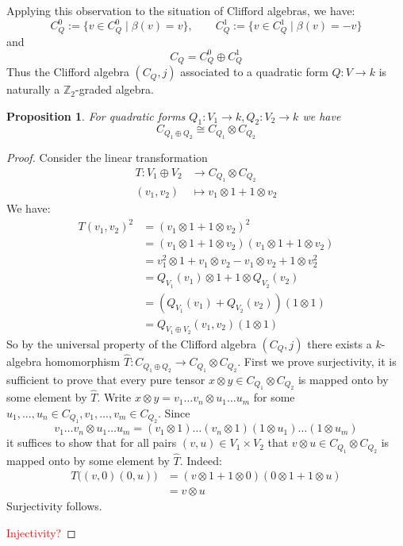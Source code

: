 \documentclass[12pt]{article}
\theoremstyle{plain}
\newtheorem{proposition}[thm]{Proposition}
\theoremstyle{definition}
\newcommand{\bb}[1]{\mathbb{#1}}
\newcommand{\lto}{\longrightarrow}
\begin{document}
Applying this observation to the situation of Clifford algebras, we have:
\begin{equation}
	C_Q^0 := \lbrace v \in C_Q^0 \mid \beta(v) = v\rbrace, \qquad C_Q^1 := \lbrace v \in C_Q^1 \mid \beta(v) = -v\rbrace
\end{equation}
and
\begin{equation}
	C_Q = C_Q^0 \oplus C_Q^1
\end{equation}
Thus the Clifford algebra $(C_Q,j)$ associated to a quadratic form $Q: V \lto k$ is naturally a $\bb{Z}_2$-graded algebra.
\begin{proposition}\label{prop:sum_tensor}
	For quadratic forms $Q_1: V_1 \lto k, Q_2: V_2 \lto k$ we have
	\begin{equation}
		C_{Q_1 \oplus Q_2} \cong C_{Q_1} \otimes C_{Q_2}
	\end{equation}
\end{proposition}
\begin{proof}
	Consider the linear transformation
	\begin{align*}
		T: V_1 \oplus V_2 &\lto C_{Q_1} \otimes C_{Q_2}\\
		(v_1,v_2) &\longmapsto v_1 \otimes 1 + 1 \otimes v_2
	\end{align*}
	We have:
	\begin{align*}
		T(v_1,v_2)^2 &= (v_1 \otimes 1 + 1 \otimes v_2)^2\\
		&= (v_1 \otimes 1 + 1 \otimes v_2)(v_1 \otimes 1 + 1 \otimes v_2)\\
		&= v_1^2 \otimes 1 + v_1 \otimes v_2 - v_1 \otimes v_2 + 1 \otimes v_2^2\\
		&= Q_{V_1}(v_1) \otimes 1 + 1 \otimes Q_{V_2}(v_2)\\
		&= (Q_{V_1}(v_1) + Q_{V_2}(v_2))(1 \otimes 1)\\
		&= Q_{V_1 \oplus V_2}(v_1,v_2)(1 \otimes 1)
	\end{align*}
	So by the universal property of the Clifford algebra $(C_Q,j)$ there exists a $k$-algebra homomorphism $\hat{T}: C_{Q_1 \oplus Q_2} \lto C_{Q_1} \otimes C_{Q_2}$. First we prove surjectivity, it is sufficient to prove that every pure tensor $x \otimes y \in C_{Q_1} \otimes C_{Q_2}$ is mapped onto by some element by $\hat{T}$. Write $x \otimes y = v_1\hdots v_n \otimes u_1 \hdots u_m$ for some $u_1,...,u_n \in C_{Q_1}, v_1,...,v_m \in C_{Q_2}$. Since
	\begin{equation}
		v_1\hdots v_n \otimes u_1 \hdots u_m = (v_1 \otimes 1)\hdots(v_n \otimes 1)(1 \otimes u_1)\hdots (1 \otimes u_m)
	\end{equation}
	it suffices to show that for all pairs $(v,u) \in V_1 \times V_2$ that $v \otimes u \in C_{Q_1} \otimes C_{Q_2}$ is mapped onto by some element by $\hat{T}$. Indeed:
	\begin{align*}
		T\big((v,0)(0,u)\big) &= (v \otimes 1 + 1 \otimes 0)(0 \otimes 1 + 1 \otimes u)\\
		&= v\otimes u
	\end{align*}
	Surjectivity follows.
	
	\textcolor{red}{Injectivity?}
\end{proof}
\end{document}
